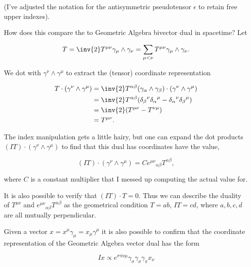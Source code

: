(I've adjusted the notation for the antisymmetric pseudotensor $\epsilon$ to retain free upper indexes).

How does this compare the to Geometric Algebra bivector dual in spacetime?  Let

\begin{equation}\label{eqn:antisymmetricTensorTx:520}
T = \inv{2} T^{\mu \nu} \gamma_\mu \wedge \gamma_\nu 
= \sum_{\mu < \nu} T^{\mu \nu} \gamma_\mu \wedge \gamma_\nu.
\end{equation}

We dot with $\gamma^\nu \wedge \gamma^\mu$ to extract the (tensor) coordinate representation

\begin{align*}
T \cdot (\gamma^\nu \wedge \gamma^\mu)
&= 
\inv{2} T^{\alpha \beta} (\gamma_\alpha \wedge \gamma_\beta ) \cdot (\gamma^\nu \wedge \gamma^\mu) \\
&= 
\inv{2} T^{\alpha \beta} ( {\delta_\beta}^\nu {\delta_\alpha}^\mu -{\delta_\alpha}^\nu {\delta_\beta}^\mu ) \\
&= 
\inv{2} (T^{\mu \nu} - T^{\nu \mu}) \\
&= 
T^{\mu \nu}.
\end{align*}

The index manipulation gets a little hairy, but one can expand the dot products $(I T) \cdot (\gamma^\nu \wedge \gamma^\mu)$ to find that this dual has coordinates have the value,

\begin{equation}\label{eqn:antisymmetricTensorTx:530}
(I T) \cdot (\gamma^\nu \wedge \gamma^\mu) = C {e^{\mu \nu}}_{\alpha \beta} T^{\alpha \beta},
\end{equation}

where $C$ is a constant multiplier that I messed up computing the actual value for.

It is also possible to verify that $(IT) \cdot T = 0$.  Thus we can describe the duality of $T^{\mu \nu}$ and ${e^{\mu \nu}}_{\alpha \beta} T^{\alpha \beta}$ as the geometrical condition $T = a b$, $IT = c d$, where $a, b, c, d$ are all mutually perpendicular.

Given a vector $x = x^\mu \gamma_\mu = x_\mu \gamma^\mu$ it is also possible to confirm that the coordinate representation of the Geometric Algebra vector dual has the form

\begin{equation}\label{eqn:antisymmetricTensorTx:540}
I x \propto e^{\sigma \pi \nu \mu} \gamma_\sigma \gamma_\sigma \gamma_\pi x_\nu
\end{equation}

